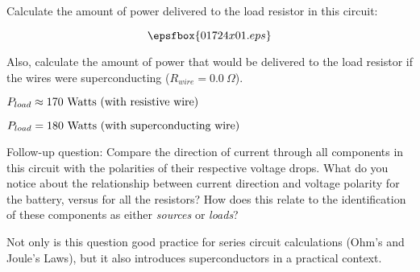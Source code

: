 

Calculate the amount of power delivered to the load resistor in this circuit:

$$\epsfbox{01724x01.eps}$$

Also, calculate the amount of power that would be delivered to the load resistor if the wires were superconducting ($R_{wire} = 0.0 \> \Omega$).







$P_{load} \approx 170 \hbox{ Watts (with resistive wire)}$

$P_{load} = 180 \hbox{ Watts (with superconducting wire)}$

\vskip 10pt

Follow-up question: Compare the direction of current through all components in this circuit with the polarities of their respective voltage drops.  What do you notice about the relationship between current direction and voltage polarity for the battery, versus for all the resistors?  How does this relate to the identification of these components as either {\it sources} or {\it loads}?







Not only is this question good practice for series circuit calculations (Ohm's and Joule's Laws), but it also introduces superconductors in a practical context.




